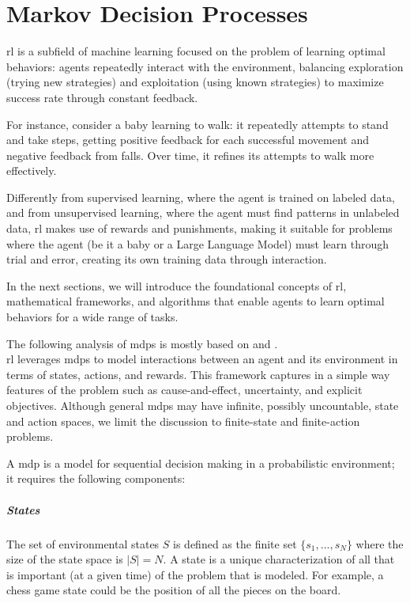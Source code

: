 \chapter{Markov Decision Processes}

\gls{rl} is a subfield of machine learning focused on the problem of learning 
optimal behaviors: agents repeatedly interact with the environment, balancing 
exploration (trying new strategies) and exploitation (using known strategies) 
to maximize success rate through constant feedback. \

For instance, consider a baby learning to walk: it repeatedly attempts to stand 
and take steps, getting positive feedback for each successful movement and 
negative feedback from falls. Over time, it refines its attempts to walk 
more effectively. \

Differently from supervised learning, where the agent is trained on labeled data, 
and from unsupervised learning, where the agent must find patterns in unlabeled data,
\gls{rl} makes use of rewards and punishments, making it suitable for problems 
where the agent (be it a baby or a Large Language Model) must learn through trial and error, creating its own training data 
through interaction.

In the next sections, we will introduce the foundational concepts of \gls{rl}, 
mathematical frameworks, and algorithms that enable agents to learn optimal behaviors for 
a wide range of tasks.

The following analysis of \glspl{mdp} is mostly based on \cite{d1afac99aad548188c9d47063c7109df} 
and \cite{Sutton1998}. \\


\gls{rl} leverages \glspl{mdp} to model interactions between 
an agent and its environment in terms of states, actions, and rewards. 
This framework captures in a simple way features of the problem such as cause-and-effect, 
uncertainty, and explicit objectives.
Although general \glspl{mdp} may have infinite, possibly uncountable, state and action
spaces, we limit the discussion to finite-state and finite-action problems.

A \gls{mdp} is a model for sequential decision making in a probabilistic environment; it requires
the following components:

\paragraph{States}
The set of environmental states $S$ is defined as the finite set $\{s_1 , . . . , s_N \}$ where the
size of the state space is $|S| = N$. A state is a unique characterization of all
that is important (at a given time) of the problem that is modeled. For example, a chess game state 
could be the position of all the pieces on the board.

